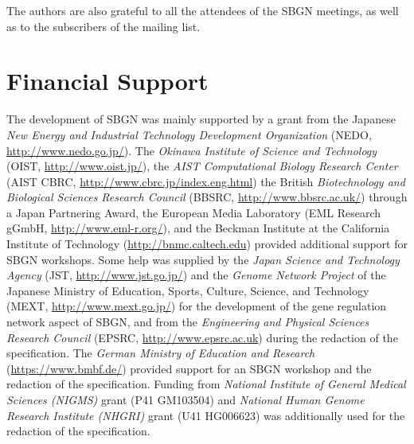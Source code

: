 The authors are also grateful to all the attendees of the SBGN meetings, as 
well as to the subscribers of the  mailing list.


\section{Financial Support}

The development of SBGN was mainly supported by a grant from the Japanese \emph{New Energy and Industrial Technology Development Organization} (NEDO, \url{http://www.nedo.go.jp/}).  The \emph{Okinawa Institute of Science and Technology} (OIST, \url{http://www.oist.jp/}), the \emph{AIST Computational Biology Research Center} (AIST CBRC, \url{http://www.cbrc.jp/index.eng.html}) the British \emph{Biotechnology and Biological Sciences Research Council} (BBSRC, \url{http://www.bbsrc.ac.uk/}) through a Japan Partnering Award, the European Media Laboratory (EML Research gGmbH, \url{http://www.eml-r.org/}), and the Beckman Institute at the California Institute of Technology (\url{http://bnmc.caltech.edu}) provided additional support for SBGN workshops. Some help was supplied by the \emph{Japan Science and Technology Agency} (JST, \url{http://www.jst.go.jp/}) and the \emph{Genome Network Project} of the Japanese Ministry of Education, Sports, Culture, Science, and Technology (MEXT, \url{http://www.mext.go.jp/}) for the development of the gene regulation network aspect of SBGN, and from the \emph{Engineering and Physical Sciences Research Council} (EPSRC, \url{http://www.epsrc.ac.uk}) during the redaction of the specification. The \emph{German Ministry of Education and Research} (\url{https://www.bmbf.de/}) provided support for an SBGN workshop and the redaction of the specification. Funding from \emph{National Institute of General Medical Sciences (NIGMS)} grant (P41 GM103504) and \emph{National Human Genome Research Institute (NHGRI)} grant (U41 HG006623) was additionally used for the redaction of the specification.
